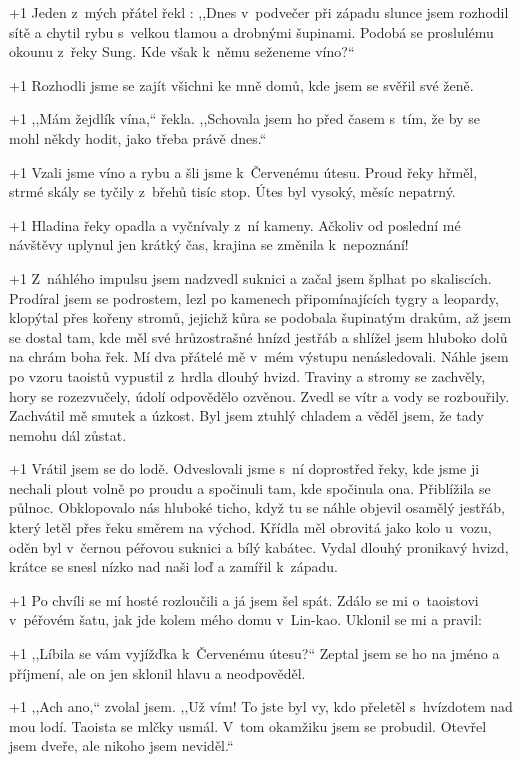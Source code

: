 \looseness+1 Jeden z mých přátel řekl : ,,Dnes v podvečer při západu slunce jsem rozhodil sítě a chytil rybu s velkou tlamou a drobnými šupinami. Podobá se proslulému okounu z řeky Sung. Kde však k němu seženeme víno?``

\looseness+1 Rozhodli jsme se zajít všichni ke mně  domů, kde jsem se svěřil  své ženě.

\looseness+1 ,,Mám žejdlík vína,`` řekla. ,,Schovala jsem ho před časem s tím, že by se mohl někdy hodit, jako třeba právě dnes.``

\looseness+1 Vzali jsme víno a rybu a šli jsme  k Červenému útesu. Proud řeky hřměl, strmé skály se tyčily  z břehů tisíc stop. Útes byl vysoký, měsíc nepatrný.

\looseness+1 Hladina řeky opadla a vyčnívaly z ní kameny. Ačkoliv od poslední mé návštěvy uplynul jen krátký čas, krajina se změnila k nepoznání!

\looseness+1 Z náhlého impulsu jsem nadzvedl suknici a začal jsem šplhat po skaliscích. Prodíral jsem se podrostem, lezl po kamenech připomínajících tygry a leopardy, klopýtal  přes kořeny stromů, jejichž kůra se podobala šupinatým drakům, až jsem se dostal tam, kde měl své  hrůzostrašné hnízd jestřáb a shlížel jsem hluboko dolů na  chrám boha řek. Mí dva přátelé mě v mém výstupu nenásledovali. Náhle jsem po vzoru taoistů vypustil z hrdla dlouhý hvizd. Traviny a stromy se zachvěly, hory se rozezvučely, údolí odpovědělo ozvěnou. Zvedl se vítr a vody se rozbouřily. Zachvátil mě smutek a úzkost. Byl jsem ztuhlý chladem a věděl jsem, že tady nemohu dál zůstat.

\looseness+1 Vrátil jsem se do lodě. Odveslovali jsme s ní doprostřed řeky, kde jsme ji nechali plout volně po proudu  a spočinuli tam, kde spočinula ona. Přiblížila se půlnoc. Obklopovalo nás hluboké ticho, když tu se náhle  objevil osamělý jestřáb, který letěl přes řeku směrem na východ. Křídla měl obrovitá jako kolo u~vozu, oděn byl v~černou péřovou suknici a bílý kabátec. Vydal dlouhý pronikavý hvizd, krátce se snesl  nízko nad naši loď a zamířil k západu.

\looseness+1 Po chvíli se mí hosté rozloučili a já jsem šel spát. Zdálo se mi o~taoistovi v péřovém šatu, jak jde kolem mého domu v Lin-kao. Uklonil se mi a pravil:

\looseness+1 ,,Líbila  se vám vyjížďka k Červenému útesu?`` Zeptal jsem se ho na jméno a příjmení, ale on jen sklonil hlavu a neodpověděl.

\looseness+1 ,,Ach ano,`` zvolal jsem. ,,Už  vím! To jste byl vy, kdo přeletěl s hvízdotem nad mou lodí.
Taoista se mlčky usmál. V tom okamžiku jsem se probudil. Otevřel jsem dveře, ale nikoho jsem neviděl.``

